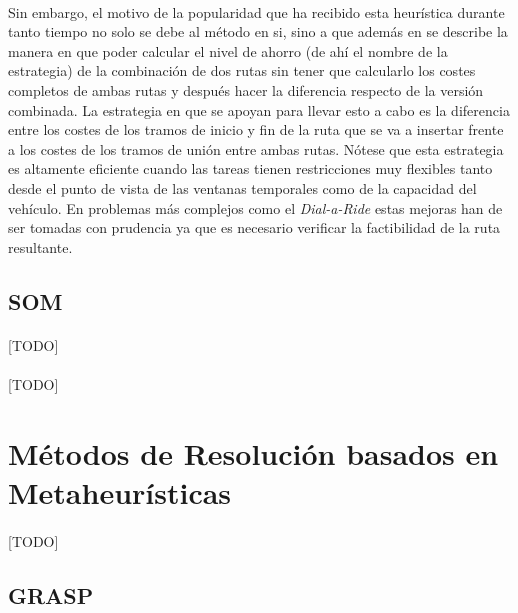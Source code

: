 \documentclass{subfiles}
\begin{document}
        \paragraph{}
        Sin embargo, el motivo de la popularidad que ha recibido esta heurística durante tanto tiempo no solo se debe al método en si, sino a que además en \cite{clarke1964scheduling} se describe la manera en que poder calcular el nivel de ahorro (de ahí el nombre de la estrategia) de la combinación de dos rutas sin tener que calcularlo los costes completos de ambas rutas y después hacer la diferencia respecto de la versión combinada. La estrategia en que se apoyan para llevar esto a cabo es la diferencia entre los costes de los tramos de inicio y fin de la ruta que se va a insertar frente a los costes de los tramos de unión entre ambas rutas. Nótese que esta estrategia es altamente eficiente cuando las tareas tienen restricciones muy flexibles tanto desde el punto de vista de las ventanas temporales como de la capacidad del vehículo. En problemas más complejos como el \emph{Dial-a-Ride} estas mejoras han de ser tomadas con prudencia ya que es necesario verificar la factibilidad de la ruta resultante.
        
      \subsection{SOM}
      \label{sec:solving_som}

        \paragraph{}
        [TODO]

      \paragraph{}
      [TODO]

    \section{Métodos de Resolución basados en Metaheurísticas}
    \label{sec:solving_metaheuristics}

      \paragraph{}
      [TODO]

      \subsection{GRASP}
      \label{sec:solving_grasp}
\end{document}
